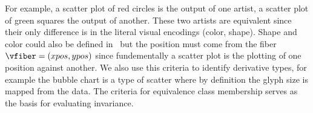 \documentclass[../main.tex]{subfiles}
\begin{document}
For example, a scatter plot of red circles is the output of one artist, a scatter plot of green squares the output of another. These two artists are equivalent since their only difference is in the literal visual encodings (color, shape). Shape and color could also be defined in \vmark\, but the position must come from the fiber $\vfiber=(xpos,ypos)$ since fundementally a scatter plot is the plotting of one position against another\cite{friendlyBriefHistoryData2008}. We also use this criteria to identify derivative types, for example the bubble chart\cite{tufteVisualDisplayQuantitative2001} is a type of scatter where by definition the glyph size is mapped from the data. The criteria for equivalence class membership serves as the basis for evaluating invariance\cite{kindlmann2014algebraic}. 
\end{document}

